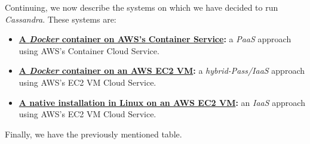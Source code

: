 \documentclass{article}[12pt]
\numberwithin{equation}{section}
\begin{document}
\begin{flushleft}
\begin{spacing}{1.5}
Continuing, we now describe the systems on which we have decided to run \emph{Cassandra}.  These systems are:

\begin{itemize}
	\item \textbf{\underline{A \emph{Docker} container on AWS's Container Service}:} a \emph{PaaS} approach using AWS's Container Cloud Service.
	\item \textbf{\underline{A \emph{Docker} container on an AWS EC2 VM}:} a \emph{hybrid-Pass/IaaS} approach using AWS's EC2 VM Cloud Service.
	\item \textbf{\underline{A native installation in Linux on an AWS EC2 VM}:} an \emph{IaaS} approach using AWS's EC2 VM Cloud Service.
\end{itemize}

Finally, we have the previously mentioned table. \newline
\end{spacing}
\end{flushleft} 
\end{document}
